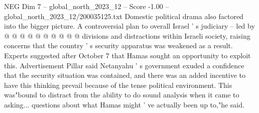 \begin{textsample}{NEG Dim 7 – global\_north\_2023\_12 – Score -1.00 – global\_north\_2023\_12/200035125.txt}
Domestic political drama also factored into the bigger picture.
A controversial plan to overall Israel ' s judiciary -- led by @ @ @ @ @ @ @ @ @ @ divisions and distractions within Israeli society, raising concerns that the country ' s security apparatus was weakened as a result.
Experts suggested after October 7 that Hamas sought an opportunity to exploit this.
Advertisement Pillar said Netanyahu ' s government exuded a confidence that the security situation was contained, and there was an added incentive to have this thinking prevail because of the tense political environment.
This was"bound to distract from the ability to do sound analysis when it came to asking... questions about what Hamas might ' ve actually been up to,"he said.

\end{textsample}
